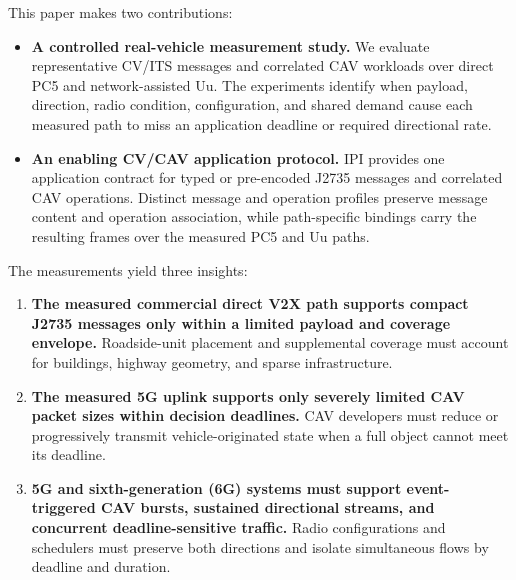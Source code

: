 This paper makes two contributions:
\begin{itemize}
  \item \textbf{A controlled real-vehicle measurement study.} We evaluate
  representative CV/ITS messages and correlated CAV workloads over direct PC5
  and network-assisted Uu. The experiments identify when payload, direction,
  radio condition, configuration, and shared demand cause each measured path
  to miss an application deadline or required directional rate.
  \item \textbf{An enabling CV/CAV application protocol.} IPI provides one
  application contract for typed or pre-encoded J2735 messages and correlated
  CAV operations. Distinct message and operation profiles preserve message
  content and operation association, while path-specific bindings carry the
  resulting frames over the measured PC5 and Uu paths.
\end{itemize}

The measurements yield three insights:
\begin{enumerate}
  \renewcommand{\labelenumi}{\arabic{enumi})}
  \item \textbf{The measured commercial direct V2X path supports compact J2735
  messages only within a limited payload and coverage envelope.} Roadside-unit
  placement and supplemental coverage must account for buildings, highway
  geometry, and sparse infrastructure.
  \item \textbf{The measured 5G uplink supports only severely limited CAV
  packet sizes within decision deadlines.} CAV developers
  must reduce or progressively transmit vehicle-originated state when a full
  object cannot meet its deadline.
  \item \textbf{5G and sixth-generation (6G) systems must support event-triggered CAV bursts,
  sustained directional streams, and concurrent deadline-sensitive traffic.}
  Radio configurations and schedulers must preserve both directions and
  isolate simultaneous flows by deadline and duration.
\end{enumerate}
